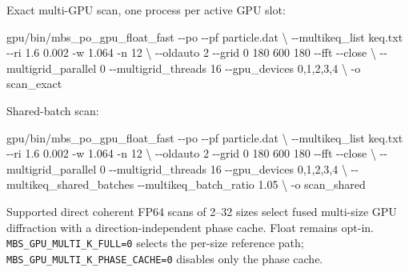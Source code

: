 \documentclass[
  10pt,
  a4paper,
]{article}
\newenvironment{Shaded}{}{}
\newcommand{\AttributeTok}[1]{\textcolor[rgb]{0.49,0.56,0.16}{#1}}
\newcommand{\DataTypeTok}[1]{\textcolor[rgb]{0.56,0.13,0.00}{#1}}
\newcommand{\ExtensionTok}[1]{#1}
\newcommand{\NormalTok}[1]{#1}
\begin{document}
Exact multi-GPU scan, one process per active GPU slot:

\begin{Shaded}
\begin{Highlighting}[]
\ExtensionTok{gpu/bin/mbs\_po\_gpu\_float\_fast} \AttributeTok{{-}{-}po} \AttributeTok{{-}{-}pf}\NormalTok{ particle.dat }\DataTypeTok{\textbackslash{}}
    \AttributeTok{{-}{-}multikeq\_list}\NormalTok{ keq.txt }\AttributeTok{{-}{-}ri}\NormalTok{ 1.6 0.002 }\AttributeTok{{-}w}\NormalTok{ 1.064 }\AttributeTok{{-}n}\NormalTok{ 12 }\DataTypeTok{\textbackslash{}}
    \AttributeTok{{-}{-}oldauto}\NormalTok{ 2 }\AttributeTok{{-}{-}grid}\NormalTok{ 0 180 600 180 }\AttributeTok{{-}{-}fft} \AttributeTok{{-}{-}close} \DataTypeTok{\textbackslash{}}
    \AttributeTok{{-}{-}multigrid\_parallel}\NormalTok{ 0 }\AttributeTok{{-}{-}multigrid\_threads}\NormalTok{ 16 }\AttributeTok{{-}{-}gpu\_devices}\NormalTok{ 0,1,2,3,4 }\DataTypeTok{\textbackslash{}}
    \AttributeTok{{-}o}\NormalTok{ scan\_exact}
\end{Highlighting}
\end{Shaded}

Shared-batch scan:

\begin{Shaded}
\begin{Highlighting}[]
\ExtensionTok{gpu/bin/mbs\_po\_gpu\_float\_fast} \AttributeTok{{-}{-}po} \AttributeTok{{-}{-}pf}\NormalTok{ particle.dat }\DataTypeTok{\textbackslash{}}
    \AttributeTok{{-}{-}multikeq\_list}\NormalTok{ keq.txt }\AttributeTok{{-}{-}ri}\NormalTok{ 1.6 0.002 }\AttributeTok{{-}w}\NormalTok{ 1.064 }\AttributeTok{{-}n}\NormalTok{ 12 }\DataTypeTok{\textbackslash{}}
    \AttributeTok{{-}{-}oldauto}\NormalTok{ 2 }\AttributeTok{{-}{-}grid}\NormalTok{ 0 180 600 180 }\AttributeTok{{-}{-}fft} \AttributeTok{{-}{-}close} \DataTypeTok{\textbackslash{}}
    \AttributeTok{{-}{-}multigrid\_parallel}\NormalTok{ 0 }\AttributeTok{{-}{-}multigrid\_threads}\NormalTok{ 16 }\AttributeTok{{-}{-}gpu\_devices}\NormalTok{ 0,1,2,3,4 }\DataTypeTok{\textbackslash{}}
    \AttributeTok{{-}{-}multikeq\_shared\_batches} \AttributeTok{{-}{-}multikeq\_batch\_ratio}\NormalTok{ 1.05 }\DataTypeTok{\textbackslash{}}
    \AttributeTok{{-}o}\NormalTok{ scan\_shared}
\end{Highlighting}
\end{Shaded}

Supported direct coherent FP64 scans of 2--32 sizes select fused multi-size
GPU diffraction with a direction-independent phase cache. Float remains opt-in.
\nolinkurl{MBS_GPU_MULTI_K_FULL=0} selects the per-size reference path;
\nolinkurl{MBS_GPU_MULTI_K_PHASE_CACHE=0} disables only the phase cache.
\end{document}
